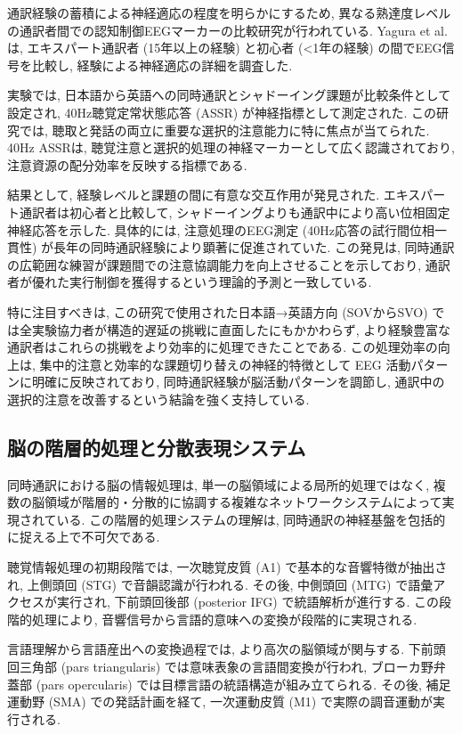 通訳経験の蓄積による神経適応の程度を明らかにするため, 異なる熟達度レベルの通訳者間での認知制御EEGマーカーの比較研究が行われている.
Yagura et al. \cite{yagura2021selective} は, エキスパート通訳者 (15年以上の経験) と初心者 (<1年の経験) の間でEEG信号を比較し, 経験による神経適応の詳細を調査した.

実験では, 日本語から英語への同時通訳とシャドーイング課題が比較条件として設定され, 40Hz聴覚定常状態応答 (ASSR) が神経指標として測定された.
この研究では, 聴取と発話の両立に重要な選択的注意能力に特に焦点が当てられた.
40Hz ASSRは, 聴覚注意と選択的処理の神経マーカーとして広く認識されており, 注意資源の配分効率を反映する指標である.

結果として, 経験レベルと課題の間に有意な交互作用が発見された.
エキスパート通訳者は初心者と比較して, シャドーイングよりも通訳中により高い位相固定神経応答を示した.
具体的には, 注意処理のEEG測定 (40Hz応答の試行間位相一貫性) が長年の同時通訳経験により顕著に促進されていた.
この発見は, 同時通訳の広範囲な練習が課題間での注意協調能力を向上させることを示しており, 通訳者が優れた実行制御を獲得するという理論的予測と一致している.

特に注目すべきは, この研究で使用された日本語→英語方向 (SOVからSVO) では全実験協力者が構造的遅延の挑戦に直面したにもかかわらず, より経験豊富な通訳者はこれらの挑戦をより効率的に処理できたことである.
この処理効率の向上は, 集中的注意と効率的な課題切り替えの神経的特徴として EEG 活動パターンに明確に反映されており, 同時通訳経験が脳活動パターンを調節し, 通訳中の選択的注意を改善するという結論を強く支持している.

\subsection{脳の階層的処理と分散表現システム}

同時通訳における脳の情報処理は, 単一の脳領域による局所的処理ではなく, 複数の脳領域が階層的・分散的に協調する複雑なネットワークシステムによって実現されている.
この階層的処理システムの理解は, 同時通訳の神経基盤を包括的に捉える上で不可欠である.

聴覚情報処理の初期段階では, 一次聴覚皮質 (A1) で基本的な音響特徴が抽出され, 上側頭回 (STG) で音韻認識が行われる.
その後, 中側頭回 (MTG) で語彙アクセスが実行され, 下前頭回後部 (posterior IFG) で統語解析が進行する.
この段階的処理により, 音響信号から言語的意味への変換が段階的に実現される.

言語理解から言語産出への変換過程では, より高次の脳領域が関与する.
下前頭回三角部 (pars triangularis) では意味表象の言語間変換が行われ, ブローカ野弁蓋部 (pars opercularis) では目標言語の統語構造が組み立てられる.
その後, 補足運動野 (SMA) での発話計画を経て, 一次運動皮質 (M1) で実際の調音運動が実行される.

